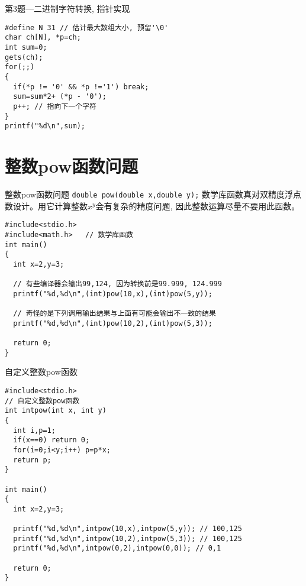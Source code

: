 \begin{frame}[fragile]{第3题---二进制字符转换, 指针实现}
\begin{lstlisting}
#define N 31 // 估计最大数组大小, 预留'\0'
char ch[N], *p=ch;
int sum=0;
gets(ch);
for(;;)
{
  if(*p != '0' && *p !='1') break;
  sum=sum*2+ (*p - '0');
  p++; // 指向下一个字符
} 
printf("%d\n",sum);
\end{lstlisting}
\end{frame}

\section{整数pow函数问题}

\begin{frame}{整数pow函数问题}
\lstinline|double pow(double x,double y);| 数学库函数真对双精度浮点数设计。用它计算整数$x^y$会有复杂的精度问题, 因此整数运算尽量不要用此函数。 
\begin{lstlisting}
#include<stdio.h>
#include<math.h>   // 数学库函数
int main()
{
  int x=2,y=3;
  
  // 有些编译器会输出99,124, 因为转换前是99.999, 124.999 
  printf("%d,%d\n",(int)pow(10,x),(int)pow(5,y)); 
  
  // 奇怪的是下列调用输出结果与上面有可能会输出不一致的结果 
  printf("%d,%d\n",(int)pow(10,2),(int)pow(5,3)); 

  return 0;
}
\end{lstlisting}
\end{frame}

\begin{frame}{自定义整数pow函数}
\begin{lstlisting}
#include<stdio.h>
// 自定义整数pow函数
int intpow(int x, int y)
{
  int i,p=1;
  if(x==0) return 0; 
  for(i=0;i<y;i++) p=p*x;
  return p;
} 

int main()
{
  int x=2,y=3;

  printf("%d,%d\n",intpow(10,x),intpow(5,y)); // 100,125
  printf("%d,%d\n",intpow(10,2),intpow(5,3)); // 100,125
  printf("%d,%d\n",intpow(0,2),intpow(0,0)); // 0,1 
  
  return 0;
}
\end{lstlisting}
\end{frame}




